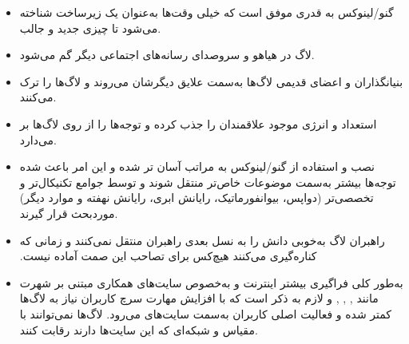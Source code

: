 \begin{itemize}
\item 
گنو/لینوکس به قدری موفق است که خیلی وقت‌ها به‌عنوان یک زیرساخت شناخته می‌شود تا چیزی جدید و جالب.

\item
لاگ در هیاهو و سروصدای رسانه‌های اجتماعی دیگر گم می‌شود.
\item
بنیانگذاران و اعضای قدیمی لاگ‌ها به‌سمت علایق دیگرشان می‌روند و لاگ‌ها را ترک می‌کنند.

\item 
{}
استعداد و انرژی موجود علاقمندان را جذب کرده و توجه‌ها را از روی لاگ‌ها بر می‌دارد.

\item
نصب و استفاده از گنو/لینوکس به مراتب آسان تر شده و این امر باعث شده
توجه‌ها بیشتر به‌سمت موضوعات خاص‌تر منتقل شوند و توسط جوامع تکنیکال‌تر
و تخصصی‌تر‌ (دواپس، بیوانفورماتیک، رایانش ابری، رایانش نهفته و موارد دیگر)
موردبحث قرار گیرند.


\item
راهبران لاگ ‫به‌خوبی دانش را به نسل بعدی راهبران منتقل نمی‌کنند و زمانی که
کناره‌گیری می‌کنند هیچ‌کس برای تصاحب این صمت آماده نیست.

\item
به‌طور کلی فراگیری بیشتر اینترنت و به‌خصوص سایت‌های همکاری مبتنی بر شهرت
مانند
,
,
,
و
لازم‌ به ذکر است که با افزایش مهارت سرچ کاربران نیاز به لاگ‌ها کمتر شده
و فعالیت اصلی کاربران به‌سمت سایت‌های
می‌رود. لاگ‌ها نمی‌توانند با مقیاس و شبکه‌ای که این سایت‌ها دارند رقابت کنند.


\end{itemize}

